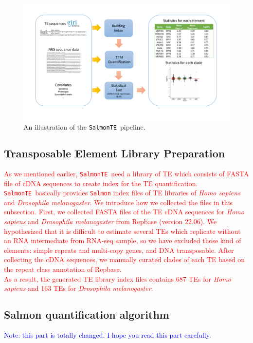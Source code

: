 \documentclass[wsdraft]{ws-procs11x85}
\newcommand{\SalmonTE}{\texttt{SalmonTE}}
\begin{document}
\begin{figure}[h]
\centerline{
\includegraphics[width=14cm]{fig1.pdf}
}
\caption{An illustration of the \SalmonTE~pipeline.}
\label{aba:fig1}
\end{figure}

\subsection{Transposable Element Library Preparation}
\textcolor{red}{
As we mentioned earlier, \SalmonTE~need a library of TE which consists of FASTA file of cDNA sequences to create index for the TE quantification. \SalmonTE~basically provides \texttt{Salmon} index files of TE libraries of \textit{Homo sapiens} and \textit{Drosophila melanogaster}. We introduce how we collected the files in this subsection. First, we collected FASTA files of the TE cDNA sequences for \textit{Homo sapiens} and \textit{Drosophila melanogaster} from Repbase (version 22.06)\cite{repbase}.
We hypothesized that it is difficult to estimate several TEs which replicate without an RNA intermediate from RNA-seq sample, so we have excluded those kind of elements: simple repeats and multi-copy genes, and DNA transposable. After collecting the cDNA sequences, we manually curated clades of each TE based on the repeat class annotation of Repbase. \\
As a result, the generated TE library index files contains 687 TEs for \textit{Homo sapiens} and 163 TEs for \textit{Drosophila melanogaster}.}

\subsection{Salmon quantification algorithm}

\textcolor{blue}{Note: this part is totally changed. I hope you read this part carefully.}
\end{document}
